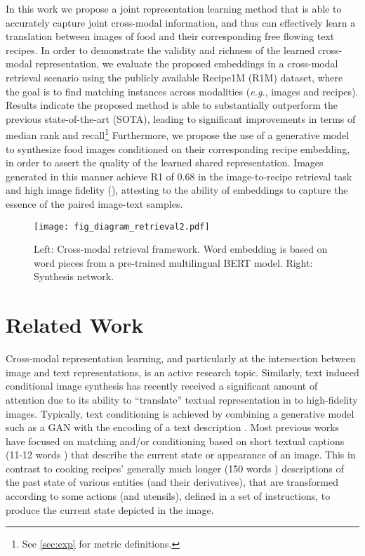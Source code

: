\documentclass[sigconf,nonacm]{acmart}
\def\eg{\emph{e.g.}} \def\Eg{\emph{E.g.}}
\begin{document}
In this work we propose a joint representation learning method that is able to accurately capture joint cross-modal information, and thus can effectively learn a translation between images of food and their corresponding free flowing text recipes. In order to demonstrate the validity and richness of the learned cross-modal representation, we evaluate the proposed embeddings in a cross-modal retrieval scenario using the publicly available Recipe1M (R1M) dataset, where the goal is to find matching instances across modalities (\eg, images and recipes). Results indicate the proposed method is able to substantially outperform the previous state-of-the-art (SOTA), leading to significant improvements in terms of median rank and recall\footnote{See \autoref{sec:exp} for metric definitions.} Furthermore, we propose the use of a generative model to synthesize food images conditioned on their corresponding recipe embedding, in order to assert the quality of the learned shared representation. Images generated in this manner 
achieve R1 of 0.68 in the image-to-recipe retrieval task 
and
high image fidelity (), attesting to the ability of embeddings to capture the essence of the paired image-text samples. 

\begin{figure*}[!ht]
\begin{center}
\texttt{[image: fig\_diagram\_retrieval2.pdf]}
\end{center}
\caption{Left: Cross-modal retrieval framework. Word embedding is based on word pieces from a pre-trained multilingual BERT model. Right: Synthesis network. 
}
\label{fig:diagram}
\vspace{-1em}
\end{figure*}

\section{Related Work}
Cross-modal representation learning, and particularly at the intersection between image and text representations, is an active research topic\cite{lee18,gu18,huang19}. Similarly, text induced conditional image synthesis has recently received a significant amount of attention due to its ability to ``translate'' textual representation in to high-fidelity images. Typically, text conditioning is achieved by combining a generative model such as a GAN with the encoding of a text description \cite{reed16,han2017stackgan,Xu_2018_CVPR,Zhu_2019_CVPR}. Most previous works have focused on matching and/or conditioning based on short textual captions (11-12 words \cite{coco,flicker30k}) that describe the current state or appearance of an image. This in contrast to cooking recipes' generally much longer (150 words \cite{salvador2017,marin2019}) descriptions of the past state of various entities (and their derivatives), that are transformed according to some actions (and utensils), defined in a set of instructions, to produce the current state depicted in the image. 
\end{document}
